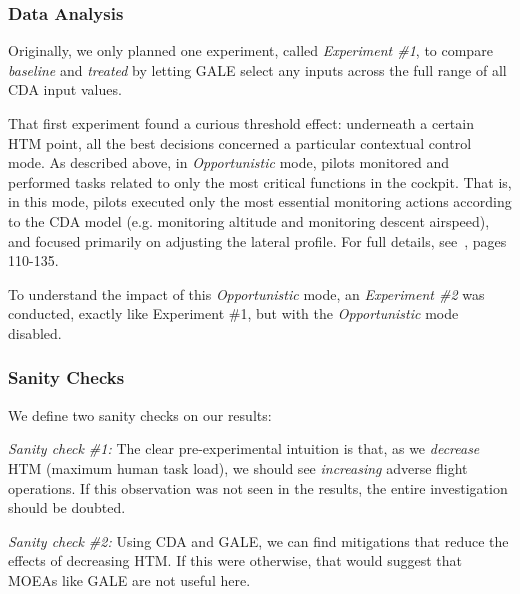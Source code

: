 \documentclass[journal]{IEEEtran}
\newenvironment{changed}{\par}{\par}
\begin{document}
\subsubsection{Data Analysis}
Originally, we only planned one experiment, called {\em Experiment \#1},  to compare {\em baseline} and {\em treated} by letting GALE select any inputs across the full range of all CDA input values.

\begin{changed}
That first experiment found a curious threshold effect: underneath a certain HTM point, all the best decisions concerned a particular contextual control mode.  
As described above, in {\em Opportunistic} mode, pilots monitored and performed tasks related to only the most critical functions in the cockpit. 
That is, in this mode, pilots executed only the most essential monitoring actions according to the CDA model (e.g. monitoring altitude and monitoring descent airspeed), and focused primarily on adjusting the lateral profile.  For full details, see~\cite{Kim2011}, pages 110-135.
\end{changed}

To  understand the impact of this {\em Opportunistic} mode, an {\em Experiment \#2} was conducted, exactly like Experiment \#1, but with the {\em Opportunistic} mode  disabled.

\subsubsection{Sanity Checks}
We define two  sanity checks on our results:

{\em Sanity check \#1:}
The clear pre-experimental intuition is that, as we 
{\em decrease}
HTM (maximum human task load), we should see {\em increasing} adverse flight operations. 
If this observation was not seen in the results, the entire investigation should be doubted.

{\em Sanity check \#2:} Using CDA and GALE, we can find mitigations that reduce the effects of decreasing HTM. 
If this were otherwise, that would suggest that MOEAs like GALE are not useful here.



\end{document}
